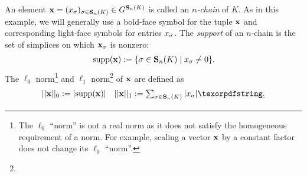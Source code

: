 \DIFaddbegin \begin{remark}\label{rm:group}
\end{remark}

\DIFaddend An element $\mathbf{x} = (x_\sigma)_{\sigma \in \mathbf{S}_n(K)} \in G^{\mathbf{S}_n(K)}$ is called an \emph{$n$-chain} of $K$.   As  in this example, we will generally use a bold-face symbol for the tuple $\mathbf{x}$ and corresponding light-face symbols for entries $x_\sigma$.  The \emph{support} of an $n$-chain is the set of simplices on which $\mathbf{x}_\sigma$ is nonzero:  
%
    \begin{align*}
        \mathrm{supp}(\mathbf{x})  :=\{ \sigma \in \mathbf{S}_n(K) \mid x_\sigma \neq 0 \}.
    \end{align*}
%
The $\ell_0$ norm\footnote{The $\ell_0$ ``norm'' is not a real norm as it does not satisfy the homogeneous requirement of a norm. For example, scaling a vector $\mathbf{x}$ by a constant factor does not change its $\ell_0$ ``norm''.} and  $\ell_1$ norm\DIFaddbegin \footnote{ } \DIFaddend of $\mathbf{x}$ are defined as 
    \begin{align*}
        ||\optimalrep||_0 := |\supp(\optimalrep) |
        &&
        \textstyle
        ||\optimalrep||_1 := \sum_{ \sigma \in \Simplices_n(K)} | \orepentry_\sigma  |
    \DIFdelbegin \DIFdel{.
    }\DIFdelend \end{align*}

\DIFdelbegin %

